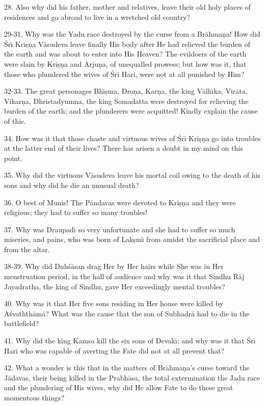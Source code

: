 28. Also why did his father, mother and relatives, leave their old holy places of residences and go abroad to live in a wretched old country?

29-31. Why was the Yadu race destroyed by the curse from a Br\=ahma\d{n}a! How did \'Sr\={\i} Kri\d{s}\d{n}a V\=asudeva leave finally His body after He had relieved the burden of the earth and was about to enter into His Heaven? The evildoers of the earth were slain by Kri\d{s}\d{n}a and Arju\d{n}a, of unequalled prowess; but how was it, that those who plundered the wives of \'Sr\={\i} Hari, were not at all punished by Him?

32-33. The great personages Bh\={\i}\d{s}ma, Dro\d{n}a, Kar\d{n}a, the king V\=alh\={\i}ka, Vir\=ata, Vikar\d{n}a, Dhristadyumna, the king Somadatta were destroyed for relieving the burden of the earth; and the plunderers were acquitted! Kindly explain the cause of this.

34. How was it that those chaste and virtuous wives of \'Sr\={\i} Kri\d{s}\d{n}a go into troubles at the latter end of their lives? There has arisen a doubt in my mind on this point.

35. Why did the virtuous V\=asudeva leave his mortal coil owing to the death of his sons and why did he die an unusual death?

36. O best of Munis! The P\=andavas were devoted to Kri\d{s}\d{n}a and they were religious; they had to suffer so many troubles!

37. Why was Draupad\={\i} so very unfortunate and she had to suffer so much miseries, and pains, who was born of Lak\d{s}m\={\i} from amidst the sacrificial place and from the altar.

38-39. Why did Duh\'s\=asan drag Her by Her hairs while She was in Her menstruation period, in the hall of audience and why was it that Sindhu R\=aj Jayadratha, the king of Sindhu, gave Her exceedingly mental troubles?

40. Why was it that Her five sons residing in Her house were killed by A\'svathth\=am\=a? What was the cause that the son of Subhadr\=a had to die in the battlefield?

41. Why did the king Kamsa kill the six sons of Devak\={\i}; and why was it that \'Sr\={\i} Hari who was capable of averting the Fate did not at all prevent that?

42. What a wonder is this that in the matters of Br\=ahma\d{n}a's curse toward the J\=adavas, their being killed in the Prabh\=asa, the total extermination the Jadu race and the plundering of His wives, why did He allow Fate to do these great momentous things?

